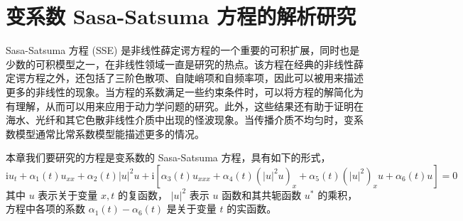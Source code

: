 \chapter{变系数 Sasa-Satsuma 方程的解析研究}
Sasa-Satsuma 方程 (SSE) 是非线性薛定谔方程的一个重要的可积扩展，同时也是少数的可积模型之一，在非线性领域一直是研究的热点。该方程在经典的非线性薛定谔方程之外，还包括了三阶色散项、自陡峭项和自频率项，因此可以被用来描述更多的非线性的现象。当方程的系数满足一些约束条件时，可以将方程的解简化为有理解，从而可以用来应用于动力学问题的研究。此外，这些结果还有助于证明在海水、光纤和其它色散非线性介质中出现的怪波现象。当传播介质不均匀时，变系数模型通常比常系数模型能描述更多的情况。

本章我们要研究的方程是变系数的 Sasa-Satsuma 方程，具有如下的形式，
\begin{equation}
  \mathrm{i}u_{t} + \alpha_{1}(t)u_{xx} + \alpha_2(t)|u|^{2}u + \mathrm{i}\left[\alpha_3(t)u_{xxx} + \alpha_{4}(t)(|u|^{2}u)_{x} + \alpha_{5}(t)(|u|^{2})_{x}u + \alpha_{6}(t)u \right] = 0  \label{ss-1}
\end{equation}
其中 $u$ 表示关于变量 $x, t$ 的复函数， $|u|^2$ 表示 $u$ 函数和其共轭函数 $u^*$ 的乘积，方程中各项的系数 $\alpha_1(t) - \alpha_6(t)$ 是关于变量 $t$ 的实函数。

